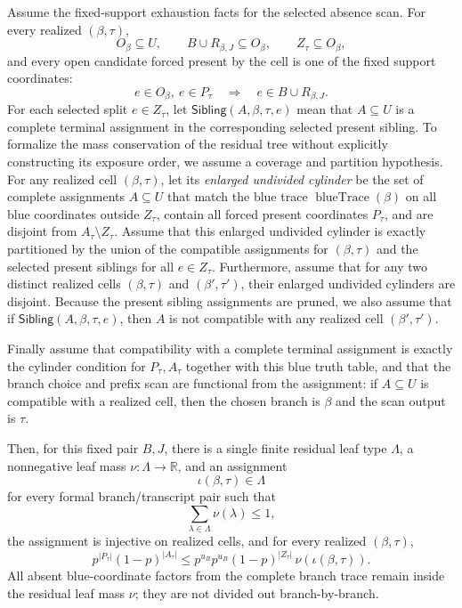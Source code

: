 \begin{helper}
Assume the fixed-support exhaustion facts for the selected absence scan.  For
every realized \((\beta,\tau)\),
\[
O_\beta\subseteq U,\qquad
B\cup R_{\beta,J}\subseteq O_\beta,\qquad
Z_\tau\subseteq O_\beta,
\]
and every open candidate forced present by the cell is one of the fixed
support coordinates:
\[
e\in O_\beta,\ e\in P_\tau
  \quad\Longrightarrow\quad
e\in B\cup R_{\beta,J}.
\]
For each selected split \(e\in Z_\tau\), let
\(\mathsf{Sibling}(A,\beta,\tau,e)\) mean that \(A\subseteq U\) is a
complete terminal assignment in the corresponding selected present sibling.
To formalize the mass conservation of the residual tree without explicitly
constructing its exposure order, we assume a coverage and partition hypothesis.
For any realized cell \((\beta,\tau)\), let its \emph{enlarged undivided cylinder} be
the set of complete assignments \(A\subseteq U\) that match the blue trace
\(\operatorname{blueTrace}(\beta)\) on all blue coordinates outside \(Z_\tau\), contain all forced present coordinates
\(P_\tau\), and are disjoint from \(A_\tau\setminus Z_\tau\).
Assume that this enlarged undivided cylinder is exactly partitioned by the union of the
compatible assignments for \((\beta,\tau)\) and the selected present siblings
for all \(e\in Z_\tau\).
Furthermore, assume that for any two distinct realized cells \((\beta,\tau)\)
and \((\beta',\tau')\), their enlarged undivided cylinders are disjoint.
Because the present sibling assignments are pruned, we also assume that
if \(\mathsf{Sibling}(A,\beta,\tau,e)\), then \(A\) is not compatible with
any realized cell \((\beta',\tau')\).

Finally assume that compatibility with a complete terminal assignment is
exactly the cylinder condition for \(P_\tau,A_\tau\) together with this blue
truth table, and that the branch choice and prefix scan are functional from
the assignment: if \(A\subseteq U\) is compatible with a realized cell, then
the chosen branch is \(\beta\) and the scan output is \(\tau\).

Then, for this fixed pair \(B,J\), there is a single finite residual leaf
type \(\Lambda\), a nonnegative leaf mass \(\nu:\Lambda\to\mathbb R\), and
an assignment
\[
\iota(\beta,\tau)\in\Lambda
\]
for every formal branch/transcript pair such that
\[
\sum_{\lambda\in\Lambda}\nu(\lambda)\le1,
\]
the assignment is injective on realized cells, and for every realized
\((\beta,\tau)\),
\[
p^{|P_\tau|}(1-p)^{|A_\tau|}
\le
p^{u_R}p^{u_B}
(1-p)^{|Z_\tau|}\,\nu(\iota(\beta,\tau)).
\]
All absent blue-coordinate factors from the complete branch trace remain
inside the residual leaf mass \(\nu\); they are not divided out
branch-by-branch.
\end{helper}
